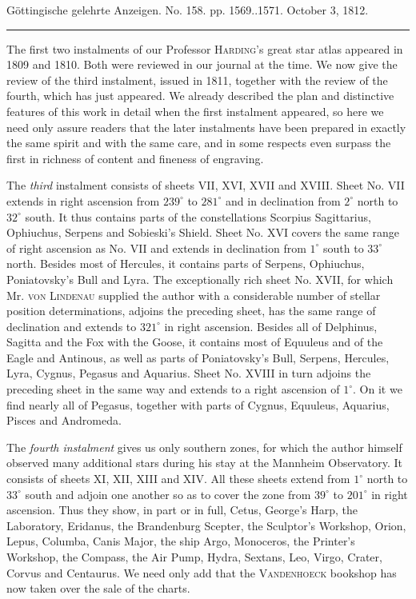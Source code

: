 \clearpage
{}
\hypertarget{native-546-lower}{}\label{native-546-lower}
\begin{center}\small Göttingische gelehrte Anzeigen. No. 158. pp. 1569..1571. October 3, 1812.\\[3pt]\rule{.72\linewidth}{.3pt}\end{center}

The first two instalments of our Professor \textsc{Harding}'s great star atlas appeared in 1809 and 1810. Both were reviewed in our journal at the time. We now give the review of the third instalment, issued in 1811, together with the review of the fourth, which has just appeared. We already described the plan and distinctive features of this work in detail when the first instalment appeared, so here we need only assure readers that the later instalments have been prepared in exactly the same spirit and with the same care, and in some respects even surpass the first in richness of content and fineness of engraving.

The \emph{third} instalment consists of sheets VII, XVI, XVII and XVIII. Sheet No. VII extends in right ascension from $239^\circ$ to $281^\circ$ and in declination from $2^\circ$ north to $32^\circ$ south. It thus contains parts of the constellations Scorpius Sagittarius, Ophiuchus, Serpens and Sobieski's Shield. Sheet No. XVI covers the same range of right ascension as No. VII and extends in declination from $1^\circ$ south to $33^\circ$ north. Besides most of Hercules, it contains parts of Serpens, Ophiuchus, Poniatovsky's Bull and Lyra. The exceptionally rich sheet No. XVII, for which Mr. \textsc{von Lindenau} supplied the author with a considerable number of stellar position determinations, adjoins the preceding sheet, has the same range of declination and extends to $321^\circ$ in right ascension. Besides all of Delphinus, Sagitta and the Fox with the Goose, it contains most of Equuleus and of the Eagle and Antinous, as well as parts of Poniatovsky's Bull, Serpens, Hercules, Lyra, Cygnus, Pegasus and Aquarius. Sheet No. XVIII in turn adjoins the preceding sheet in the same way and extends to a right ascension of $1^\circ$. On it we find nearly all of Pegasus, together with parts of Cygnus, Equuleus, Aquarius, Pisces and Andromeda.

The \emph{fourth instalment} gives us only southern zones, for which the author himself observed many additional stars during his stay at the Mannheim Observatory. It consists of sheets XI, XII, XIII and XIV. All these sheets extend from $1^\circ$ north to $33^\circ$ south and adjoin one another so as to cover the zone from $39^\circ$ to $201^\circ$ in right ascension. Thus they show, in part or in full, Cetus, George's Harp, the Laboratory, Eridanus, the Brandenburg Scepter, the Sculptor's Workshop, Orion, Lepus, Columba, Canis Major, the ship Argo, Monoceros, the Printer's Workshop, the Compass, the Air Pump, Hydra, Sextans, Leo, Virgo, Crater, Corvus and Centaurus. We need only add that the \textsc{Vandenhoeck} bookshop has now taken over the sale of the charts.
